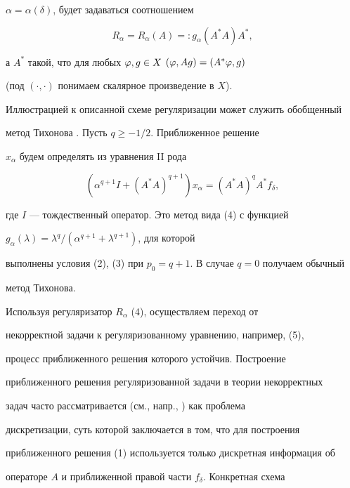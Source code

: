 $\alpha=\alpha(\delta)$, будет задаваться соотношением


\begin{equation}


R_\alpha=R_\alpha(A) =: g_\alpha(A^*A)A^* ,


\end{equation}


а $A^*$ такой, что для любых $\varphi,g\in X$\; $(\varphi,Ag)=(A^*\varphi,g)$


(под $(\cdot,\cdot)$  понимаем скалярное произведение в $X$).





Иллюстрацией к описанной схеме регуляризации может служить обобщенный


метод Тихонова \cite{PV}. Пусть $q\ge -1/2$. Приближенное решение


$x_\alpha$ будем определять из уравнения II рода


\begin{equation}


(\alpha^{q+1}I + (A^*A)^{q+1}) x_\alpha = (A^*A)^q A^*f_\delta,


\end{equation}


где $I$ --- тождественный оператор. Это метод вида (4) с  функцией


$g_\alpha(\lambda)=\lambda^q/(\alpha^{q+1}+\lambda^{q+1})$, для которой


выполнены условия (2), (3) при $p_0=q+1$. В случае $q=0$ получаем обычный


метод Тихонова.





Используя регуляризатор $R_\alpha$ (4), осуществляем переход от


некорректной задачи к регуляризованному уравнению, например, (5),


процесс приближенного решения которого устойчив. Построение


приближенного решения регуляризованной задачи в теории некорректных


задач часто рассматривается (см., напр., \cite{V}) как проблема


дискретизации, суть которой заключается в том, что для построения


приближенного решения (1) используется только дискретная информация об


операторе $A$ и приближенной правой части $f_\delta$. Конкретная схема


